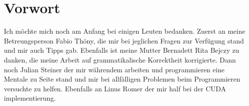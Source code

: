 \section*{Vorwort}
Ich möchte mich noch am Anfang bei einigen Leuten bedanken. Zuerst an meine Betreungsperson Fabio Thöny, die mir bei jeglichen Fragen zur Verfügung stand und mir auch Tipps gab. Ebenfalls ist meine Mutter Bernadett Rita Bejczy zu danken, die meine Arbeit auf grammatikalische Korrektheit korrigierte. Dann noch Julian Steiner der mir währendem arbeiten und programmieren eine Mentale zu Seite stand und mir bei allfälligen Problemen beim Programmieren versuchte zu helfen. Ebenfalls an Linus Romer der mir half bei der CUDA implementierung.